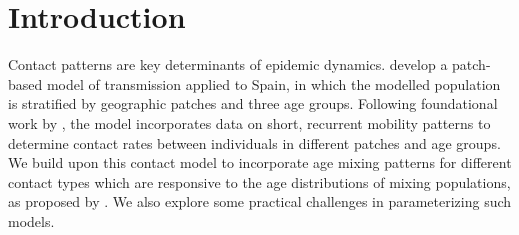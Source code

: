 \section{Introduction}\label{intro}
Contact patterns are key determinants of epidemic dynamics.
\citet{Arenas2020} develop a patch-based model of \covid transmission applied to Spain,
in which the modelled population is stratified by geographic patches and three age groups.
Following foundational work by \citet{Balcan2011,Sattenspiel1995},
the model incorporates data on short, recurrent mobility patterns
to determine contact rates between individuals in different patches and age groups.
We build upon this contact model to incorporate age mixing patterns
for different contact types which are responsive to
the age distributions of mixing populations, as proposed by \citet{Arregui2018}.
We also explore some practical challenges in parameterizing such models.